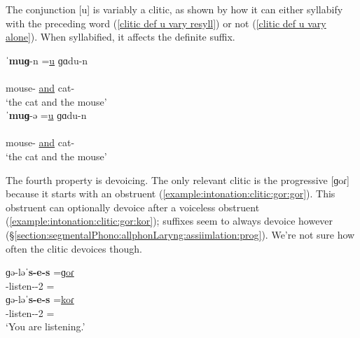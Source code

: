 The conjunction [u] is variably a clitic, as shown by how it can either  syllabify with the preceding word (\ref{clitic def u vary resyll}) or not (\ref{clitic def u vary alone}). When syllabified, it affects the definite suffix. 


\begin{exe}
	\ex 
	\begin{xlist}
		\ex \glll ˈ\textbf{muɡ}-n =\underline{u} ɡɑdu-n\\ 
		[ˈ\textbf{muɡ}. \underline{nu}. ɡɑ.dun]  \\
		mouse-{}  \underline{and} cat-{} \\
		\trans `the cat and the mouse' \label{clitic def u vary resyll}\\
		\ex \glll  ˈ\textbf{muɡ}-ə =\underline{u} ɡɑdu-n\\ 
		[ˈ\textbf{mu}.ɡə. \underline{u}. ɡɑ.dun]  \\
		mouse-{}  \underline{and} cat-{} \\
		\trans `the cat and the mouse'  \label{clitic def u vary alone}\\
	\end{xlist}
	
\end{exe}


The fourth property is devoicing. The only relevant clitic is the progressive [ɡoɾ] because it starts with an obstruent (\ref{example:intonation:clitic:gor:gor}). This obstruent can optionally devoice after a voiceless obstruent (\ref{example:intonation:clitic:gor:kor}); suffixes seem to always devoice however (\S\ref{section:segmentalPhono:allphonLaryng:assiimlation:prog}). We're not sure how often the clitic devoices though. 

\begin{exe}
	\ex \begin{xlist}
		\ex \gll ɡə-ləˈ\textbf{s-e-s} =\underline{ɡoɾ} \\ 
		{\ind}-listen-{\thgloss}-2{\sg} =\underline{{\prog}} \\\label{example:intonation:clitic:gor:gor}
		\ex  \gll ɡə-ləˈ\textbf{s-e-s} =\underline{koɾ} \\ 
		{\ind}-listen-{\thgloss}-2{\sg} =\underline{{\prog}} \\
		\trans `You are listening.' \label{example:intonation:clitic:gor:kor}\\
		\armenian{Կը լսես կոր։}
	\end{xlist}
\end{exe}

